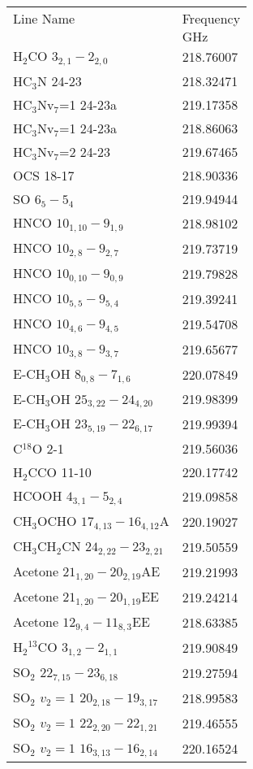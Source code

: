 \begin{table*}[htp]
\begin{minipage}[t]{0.5\textwidth}
\begin{tabular}{ll}
\label{tab:linesspw1}
Line Name & Frequency \\
 & $\mathrm{GHz}$ \\
\hline
H$_2$CO $3_{2,1}-2_{2,0}$ & 218.76007 \\
HC$_3$N 24-23 & 218.32471 \\
HC$_3$Nv$_7$=1 24-23a & 219.17358 \\
HC$_3$Nv$_7$=1 24-23a & 218.86063 \\
HC$_3$Nv$_7$=2 24-23 & 219.67465 \\
OCS 18-17 & 218.90336 \\
SO $6_5-5_4$ & 219.94944 \\
HNCO $10_{1,10}-9_{1,9}$ & 218.98102 \\
HNCO $10_{2,8}-9_{2,7}$ & 219.73719 \\
HNCO $10_{0,10}-9_{0,9}$ & 219.79828 \\
HNCO $10_{5,5}-9_{5,4}$ & 219.39241 \\
HNCO $10_{4,6}-9_{4,5}$ & 219.54708 \\
HNCO $10_{3,8}-9_{3,7}$ & 219.65677 \\
E-CH$_3$OH $8_{0,8}-7_{1,6}$ & 220.07849 \\
E-CH$_3$OH $25_{3,22}-24_{4,20}$ & 219.98399 \\
E-CH$_3$OH $23_{5,19}-22_{6,17}$ & 219.99394 \\
C$^{18}$O 2-1 & 219.56036 \\
H$_2$CCO 11-10 & 220.17742 \\
HCOOH $4_{3,1}-5_{2,4}$ & 219.09858 \\
CH$_3$OCHO $17_{4,13}-16_{4,12}$A & 220.19027 \\
CH$_3$CH$_2$CN $24_{2,22}-23_{2,21}$ & 219.50559 \\
Acetone $21_{1,20}-20_{2,19}$AE & 219.21993 \\
Acetone $21_{1,20}-20_{1,19}$EE & 219.24214 \\
Acetone $12_{9,4}-11_{8,3}$EE & 218.63385 \\
H$_2$$^{13}$CO $3_{1,2}-2_{1,1}$ & 219.90849 \\
SO$_2$ $22_{7,15}-23_{6,18}$ & 219.27594 \\
SO$_2$ $v_2=1$ $20_{2,18}-19_{3,17}$ & 218.99583 \\
SO$_2$ $v_2=1$ $22_{2,20}-22_{1,21}$ & 219.46555 \\
SO$_2$ $v_2=1$ $16_{3,13}-16_{2,14}$ & 220.16524 \\
\hline
\end{tabular}


\end{minipage}
\end{table*}
